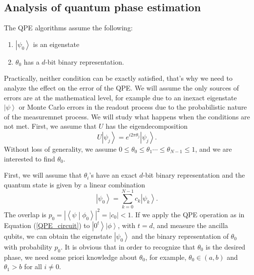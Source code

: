 \documentclass[11pt]{article}
\newcommand{\braket}[2]{\left \langle #1 \middle| #2 \right \rangle}
\newcommand{\ket}[1]{\left|#1\right\rangle}
\begin{document}
\subsection{Analysis of quantum phase estimation}
The QPE algorithms assume the following:
\begin{enumerate}
    \item $\ket{\psi_0}$ is an eigenstate
    \item $\theta_0$ has a $d$-bit binary representation.
\end{enumerate}
Practically, neither condition can be exactly satisfied, that's why we need to analyze the effect on the error of the QPE. We will assume the only sources of errors are at the mathematical level, for example due to an inexact eigenstate $\ket{\psi}$ or Monte Carlo errors in the readout process due to the probabilistic nature of the measuremnet process. We will study what happens when the conditions are not met. First, we assume that $U$ has the eigendecomposition 
\begin{equation}
    U\ket{\psi_j} = e^{i2\pi\theta_j}\ket{\psi_j}.
\end{equation}
Without loss of generality, we assume $0\leq\theta_0\leq\theta_1\cdots\leq\theta_{N-1}\leq 1$, and we are interested to find $\theta_0$. 

First, we will assume that $\theta_i$'s have an exact $d$-bit binary representation and the quantum state is given by a linear combination 
\begin{equation}
    \ket{\psi_0} = \sum_{k=0}^{N-1}c_k\ket{\psi_k}.
\end{equation}
The overlap is $p_0 = |\braket{\psi}{\phi_0}|^2 = |c_0| < 1$. If we apply the QPE operation as in Equation (\ref*{QPE_circuit})  to $\ket{0^t}\ket{\phi}$, with $t = d$, and measure the ancilla qubits, we can obtain the eigenstate $\ket{\psi_0}$ and the binary representation of $\theta_0$ with probability $p_0$. It is obvious that in order to recognize that $\theta_0$ is the desired phase, we need some priori knowledge about $\theta_0$, for example, $\theta_0 \in (a,b)$ and $\theta_1 > b$ for all $i \neq 0$.
\end{document}

